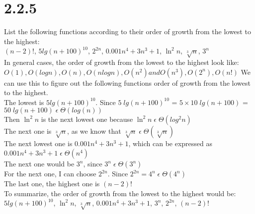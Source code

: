 \documentclass[8pt, letterpaper]{article}
\begin{document}
\section{2.2.5}
List the following functions according to their order of growth from the lowest to the highest: \\
\indent \indent $(n-2)!$, $5lg(n+100)^{10}$, $2^{2n}$, $0.001n^4 + 3n^3 + 1$, $\ln^2 n$, $\sqrt[3]{n}$, $3^n$ \\
\indent In general cases, the order of growth from the lowest to the highest look like: $O(1), O(log n), O(n), O(n log n), O(n^2) and O(n^3), O(2^n), O(n!)$ We can use this to figure out the following functions order of growth from the lowest to the highest. \\ 
\indent The lowest is $5lg(n+100)^{10}$. Since $5\;lg(n+100)^{10}$ = $5 \times10\;lg(n+100)$ = $50\;lg(n+100) \; \epsilon \; \Theta(log(n))$ \\
\indent Then $\ln^2 n$ is the next lowest one because $\ln^2 n \; \epsilon \; \Theta(log^2 n)$ \\
\indent The next one is $\sqrt[3]{n}$, as we know that $\sqrt[3]{n} \; \epsilon \; \Theta(\sqrt[3]{n})$ \\
\indent The next lowest one is $0.001n^4 + 3n^3 + 1$, which can be expressed as $0.001n^4 + 3n^3 + 1 \; \epsilon \; \Theta(n^4)$ \\
\indent The next one would be $3^n$, since $3^n \; \epsilon \; \Theta(3^n)$ \\
\indent For the next one, I can choose $2^{2n}$. Since $2^{2n} = 4^n \; \epsilon \; \Theta(4^n)$ \\
\indent The last one, the highest one is $(n-2)!$ \\
\indent To summarize, the order of growth from the lowest to the highest would be: $5lg(n+100)^{10}$, $\ln^2 n$, $\sqrt[3]{n}$, $0.001n^4 + 3n^3 + 1$, $3^n$, $2^{2n}$, $(n-2)!$  
\end{document}
